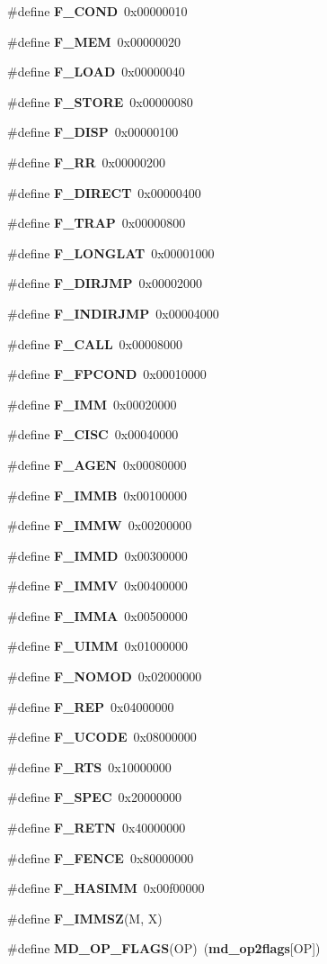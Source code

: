 \begin{CompactItemize}
\#define {\bf F\_\-COND}~0x00000010
\item 
\#define {\bf F\_\-MEM}~0x00000020
\item 
\#define {\bf F\_\-LOAD}~0x00000040
\item 
\#define {\bf F\_\-STORE}~0x00000080
\item 
\#define {\bf F\_\-DISP}~0x00000100
\item 
\#define {\bf F\_\-RR}~0x00000200
\item 
\#define {\bf F\_\-DIRECT}~0x00000400
\item 
\#define {\bf F\_\-TRAP}~0x00000800
\item 
\#define {\bf F\_\-LONGLAT}~0x00001000
\item 
\#define {\bf F\_\-DIRJMP}~0x00002000
\item 
\#define {\bf F\_\-INDIRJMP}~0x00004000
\item 
\#define {\bf F\_\-CALL}~0x00008000
\item 
\#define {\bf F\_\-FPCOND}~0x00010000
\item 
\#define {\bf F\_\-IMM}~0x00020000
\item 
\#define {\bf F\_\-CISC}~0x00040000
\item 
\#define {\bf F\_\-AGEN}~0x00080000
\item 
\#define {\bf F\_\-IMMB}~0x00100000
\item 
\#define {\bf F\_\-IMMW}~0x00200000
\item 
\#define {\bf F\_\-IMMD}~0x00300000
\item 
\#define {\bf F\_\-IMMV}~0x00400000
\item 
\#define {\bf F\_\-IMMA}~0x00500000
\item 
\#define {\bf F\_\-UIMM}~0x01000000
\item 
\#define {\bf F\_\-NOMOD}~0x02000000
\item 
\#define {\bf F\_\-REP}~0x04000000
\item 
\#define {\bf F\_\-UCODE}~0x08000000
\item 
\#define {\bf F\_\-RTS}~0x10000000
\item 
\#define {\bf F\_\-SPEC}~0x20000000
\item 
\#define {\bf F\_\-RETN}~0x40000000
\item 
\#define {\bf F\_\-FENCE}~0x80000000
\item 
\#define {\bf F\_\-HASIMM}~0x00f00000
\item 
\#define {\bf F\_\-IMMSZ}(M, X)
\item 
\#define {\bf MD\_\-OP\_\-FLAGS}(OP)~({\bf md\_\-op2flags}[OP])

\end{CompactItemize}
